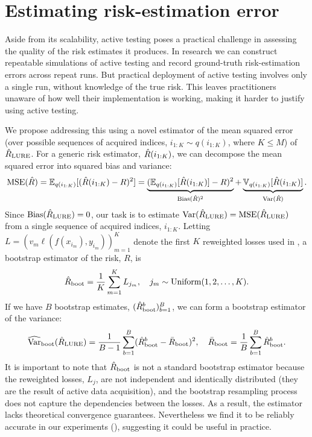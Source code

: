 \section{Estimating risk-estimation error}\label{sec:error_estimation_method}

Aside from its scalability, active testing poses a practical challenge in assessing the quality of the risk estimates it produces.
In research we can construct repeatable simulations of active testing and record ground-truth risk-estimation errors across repeat runs.
But practical deployment of active testing involves only a single run, without knowledge of the true risk.
This leaves practitioners unaware of how well their implementation is working, making it harder to justify using active testing.

We propose addressing this using a novel estimator of the mean squared error (over possible sequences of acquired indices, $i_{1:K} \sim q(i_{1:K})$, where $K \leq M$) of $\hat{R}_\mathrm{LURE}$.
For a generic risk estimator, $\hat{R}(i_{1:K})$, we can decompose the mean squared error into squared bias and variance:
\begin{align}\label{eq:mse_decomposition}
    \mathrm{MSE}(\hat{R})
    = \mathbb{E}_{q(i_{1:K})}[(\hat{R}(i_{1:K}) - R)^2]
    = \underbrace{(\mathbb{E}_{q(i_{1:K})}[\hat{R}(i_{1:K})] - R)^2}_{\mathrm{Bias}(\hat{R})^2} + \underbrace{\mathbb{V}_{q(i_{1:K})}[\hat{R}(i_{1:K})]}_{\mathrm{Var}(\hat{R})}
    .
\end{align}
Since $\mathrm{Bias}(\hat{R}_\mathrm{LURE})=0$, our task is to estimate $\mathrm{Var}(\hat{R}_\mathrm{LURE})=\mathrm{MSE}(\hat{R}_\mathrm{LURE})$ from a single sequence of acquired indices, $i_{1:K}$.
Letting $L = (v_m \ell(f(x_{i_m}), y_{i_m}))_{m=1}^K$ denote the first $K$ reweighted losses used in , a bootstrap estimator \citep{efron1979bootstrap} of the risk, $R$, is
\begin{align*}
\hat{R}_\mathrm{boot} = \frac{1}{K} \sum_{m=1}^K L_{j_m}, \quad j_m \sim \mathrm{Uniform}(1,2,\ldots,K)
.
\end{align*}
If we have $B$ bootstrap estimates, $(\hat{R}_\mathrm{boot}^b)_{b=1}^B$, we can form a bootstrap estimator of the variance:
\begin{align}\label{eq:variance_estimator}
    \widehat{\mathrm{Var}}_\mathrm{boot}(\hat{R}_\mathrm{LURE}) = \frac{1}{B-1} \sum_{b=1}^B (\hat{R}_\mathrm{boot}^b - \bar{R}_\mathrm{boot})^2, \quad \bar{R}_\mathrm{boot} = \frac{1}{B} \sum_{b=1}^B \hat{R}_\mathrm{boot}^b
    .
\end{align}
It is important to note that $\hat{R}_\mathrm{boot}$ is not a standard bootstrap estimator because the reweighted losses, $L_j$, are not independent and identically distributed (they are the result of active data acquisition), and the bootstrap resampling process does not capture the dependencies between the losses.
As a result, the estimator lacks theoretical convergence guarantees.
Nevertheless we find it to be reliably accurate in our experiments (), suggesting it could be useful in practice.